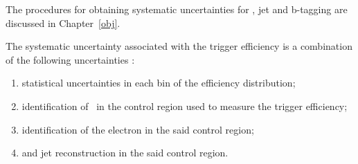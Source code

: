 \begin{table}[!h]
\begin{center}
\end{center}
\caption{Experimental systematic uncertainties.}
\label{tab:expUnc}
\end{table}


\par The procedures for obtaining systematic uncertainties for \tauvis, jet and b-tagging are 
discussed in Chapter~\ref{obj}.   

\par The systematic uncertainty associated with the trigger efficiency is a combination of the following 
uncertainties :
\begin{enumerate}
\item statistical uncertainties in each bin of the efficiency distribution; 
\item identification of \tauvis\ in the control region used to measure the trigger efficiency;
\item identification of the electron in the said control region; 
\item and jet reconstruction in the said control region. 
\end{enumerate}  


